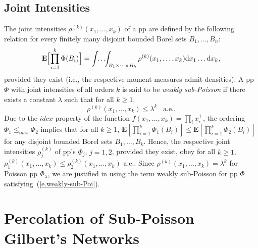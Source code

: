 \documentclass[conference]{IEEEtran}
\begin{document}
\subsection{Joint Intensities}
\label{ss.intensities}
The joint intensities $\rho^{(k)}(x_1,\ldots,x_k)$ of a pp are defined by the following relation for every finitely many disjoint bounded Borel sets $B_1,\ldots,B_n$:
$$ {{\mathbf E}}\Bigl[\prod_{i=1}^k\Phi(B_i)\Bigr] = 
\int\!\!\dots\!\!\int_{B_1\times\dots\times B_k}
\rho^{(k)}(x_1,\ldots,x_k) {\text{\rm d}} x_1 \ldots {\text{\rm d}} x_k,$$
provided  they exist (i.e., the respective moment measures admit
densities). 
 A pp $\Phi$ with joint intensities of all orders $k$ is said to be
 {\em weakly sub-Poisson} if there exists a constant ${\lambda}$ such that
 for all $k \geq 1$,  
\begin{equation}\label{e.weakly-sub-Poi}
 \rho^{(k)}(x_1,\ldots,x_k) \leq {\lambda}^k \, \, \, \, \,\mbox{a.e.}.
\end{equation}
Due to the $idcx$ property of the function $f(x_1,\ldots,x_k)=
\prod_i x_i^+$, the ordering  $\Phi_1
\leq_{idcx} \Phi_2$ implies that for all $k \geq 1$,
${{\mathbf E}}[\prod_{i=1}^k\Phi_1(B_i)] \leq {{\mathbf E}}[\prod_{i=1}^k\Phi_2(B_i)]$ for
any disjoint bounded Borel sets $B_1,\ldots,B_k$. Hence, the respective joint
intensities $\rho_j^{(k)}$ of pp's $\Phi_j$, $j=1,2$, provided they exist,
 obey for all $k \geq 1$,  $\rho^{(k)}_1(x_1,\ldots,x_k)
\leq \rho^{(k)}_2(x_1,\ldots,x_k)$ a.e.. Since 
$\rho^{(k)}(x_1,\ldots,x_k) = {\lambda}^k$ for Poisson pp $\Phi_{\lambda}$, we are
justified in using the term weakly sub-Poisson for pp $\Phi$
satisfying~(\ref{e.weakly-sub-Poi}).

\section{Percolation of Sub-Poisson Gilbert's Networks}
\label{s.Gilberts}
\end{document}
